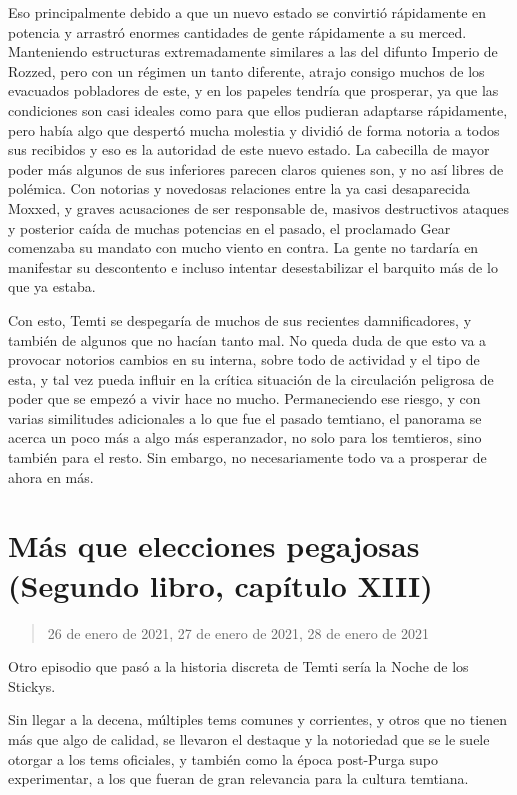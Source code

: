 \documentclass[
  spanish,
]{book}
\begin{document}
Eso principalmente debido a que un nuevo estado se convirtió rápidamente en potencia y arrastró enormes cantidades de gente rápidamente a su merced. Manteniendo estructuras extremadamente similares a las del difunto Imperio de Rozzed, pero con un régimen un tanto diferente, atrajo consigo muchos de los evacuados pobladores de este, y en los papeles tendría que prosperar, ya que las condiciones son casi ideales como para que ellos pudieran adaptarse rápidamente, pero había algo que despertó mucha molestia y dividió de forma notoria a todos sus recibidos y eso es la autoridad de este nuevo estado. La cabecilla de mayor poder más algunos de sus inferiores parecen claros quienes son, y no así libres de polémica. Con notorias y novedosas relaciones entre la ya casi desaparecida Moxxed, y graves acusaciones de ser responsable de, masivos destructivos ataques y posterior caída de muchas potencias en el pasado, el proclamado Gear comenzaba su mandato con mucho viento en contra. La gente no tardaría en manifestar su descontento e incluso intentar desestabilizar el barquito más de lo que ya estaba.

Con esto, Temti se despegaría de muchos de sus recientes damnificadores, y también de algunos que no hacían tanto mal. No queda duda de que esto va a provocar notorios cambios en su interna, sobre todo de actividad y el tipo de esta, y tal vez pueda influir en la crítica situación de la circulación peligrosa de poder que se empezó a vivir hace no mucho. Permaneciendo ese riesgo, y con varias similitudes adicionales a lo que fue el pasado temtiano, el panorama se acerca un poco más a algo más esperanzador, no solo para los temtieros, sino también para el resto. Sin embargo, no necesariamente todo va a prosperar de ahora en más.

\hypertarget{muxe1s-que-elecciones-pegajosas-segundo-libro-capuxedtulo-xiii}{%
\section{Más que elecciones pegajosas (Segundo libro, capítulo XIII)}\label{muxe1s-que-elecciones-pegajosas-segundo-libro-capuxedtulo-xiii}}

\begin{quote}
26 de enero de 2021, 27 de enero de 2021, 28 de enero de 2021
\end{quote}

Otro episodio que pasó a la historia discreta de Temti sería la Noche de los Stickys.

Sin llegar a la decena, múltiples tems comunes y corrientes, y otros que no tienen más que algo de calidad, se llevaron el destaque y la notoriedad que se le suele otorgar a los tems oficiales, y también como la época post-Purga supo experimentar, a los que fueran de gran relevancia para la cultura temtiana.
\end{document}
